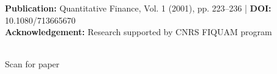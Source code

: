 \documentclass[final]{beamer}
\begin{document}
\begin{frame}[t]
\begin{columns}[t]
\begin{column}{.48\linewidth}
\begin{tcolorbox}[mybox, title=Acknowledgments]
\end{tcolorbox}

\end{column}
\end{columns}

\vspace{0.6cm}

\begin{tcolorbox}[colback=white,colframe=headerred,boxrule=2pt,arc=0pt,
    left=10pt,right=10pt,top=5pt,bottom=5pt]
\begin{minipage}{0.7\linewidth}
\large
\textbf{Publication:} Quantitative Finance, Vol. 1 (2001), pp. 223--236 | \textbf{DOI:} 10.1080/713665670\\
\textbf{Acknowledgement:} Research supported by CNRS FIQUAM program
\end{minipage}
\hfill
\begin{minipage}{0.25\linewidth}
\centering
{}\\
{\small Scan for paper}
\end{minipage}
\end{tcolorbox}

\end{frame}
\end{document}
